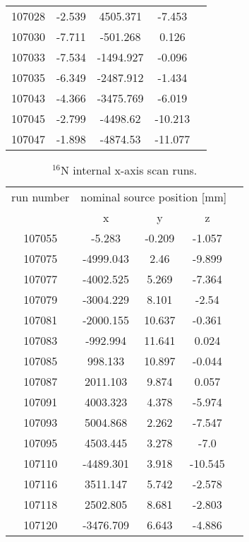 \begin{table}[ht]
\begin{tabular*}{90mm}{c@{\extracolsep{\fill}}*4c}
        107028 & -2.539 & 4505.371 & -7.453\\
        107030 & -7.711 & -501.268 & 0.126\\
        107033 & -7.534 & -1494.927 & -0.096\\
        107035 & -6.349 & -2487.912 & -1.434\\
        107043 & -4.366 & -3475.769 & -6.019\\
        107045 & -2.799 & -4498.62 & -10.213\\
        107047 & -1.898 & -4874.53 & -11.077\\
        		\bottomrule	
       	\end{tabular*}
   \end{table} 

\begin{table}[ht]
		\caption[]{$^{16}$N internal x-axis scan runs.}
		\label{table:n16scanTable_xscan}
				\centering
    	\begin{tabular*}{90mm}{c@{\extracolsep{\fill}}*4c}
    		\toprule 
    		run number  & \multicolumn{3}{c}{nominal source position [mm]}\\
    		\cline{2-4}
    		& x & y & z\\   
       \midrule
       107055 &-5.283 & -0.209 & -1.057\\
       107075 & -4999.043 & 2.46 & -9.899\\
       107077 & -4002.525 & 5.269 & -7.364\\
       107079 & -3004.229 & 8.101 & -2.54\\
       107081 & -2000.155 & 10.637 & -0.361 \\
       107083 & -992.994 & 11.641 & 0.024 \\
       107085 & 998.133 & 10.897 & -0.044\\
       107087 & 2011.103 & 9.874 & 0.057\\
       107091 & 4003.323 &  4.378 &  -5.974\\
       107093 & 5004.868 & 2.262 & -7.547\\
       107095 & 4503.445 & 3.278 & -7.0\\
       107110 & -4489.301 & 3.918 & -10.545\\
       107116 & 3511.147 & 5.742 & -2.578\\
       107118 & 2502.805 & 8.681 & -2.803\\
       107120 & -3476.709 & 6.643 & -4.886\\
		\bottomrule	
	\end{tabular*}
\end{table}

